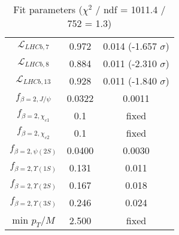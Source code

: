\begin{table}[h!]
\begin{tabular}{c|c|c}
$\mathcal L_{LHCb,7}$ & 0.972 & 0.014 (-1.657 $\sigma$) \\
$\mathcal L_{LHCb,8}$ & 0.884 & 0.011 (-2.310 $\sigma$) \\
$\mathcal L_{LHCb,13}$ & 0.928 & 0.011 (-1.840 $\sigma$) \\
$f_{\beta=2,J/\psi}$ & 0.0322 & 0.0011 \\
$f_{\beta=2,\chi_{c1}}$ & 0.1 & fixed \\
$f_{\beta=2,\chi_{c2}}$ & 0.1 & fixed \\
$f_{\beta=2,\psi(2S)}$ & 0.0400 & 0.0030 \\
$f_{\beta=2,\Upsilon(1S)}$ & 0.131 & 0.011 \\
$f_{\beta=2,\Upsilon(2S)}$ & 0.167 & 0.018 \\
$f_{\beta=2,\Upsilon(3S)}$ & 0.246 & 0.024 \\
min $p_T/M$ & 2.500 & fixed \\
\end{tabular}
\caption{Fit parameters ($\chi^2$ / ndf = 1011.4 / 752 = 1.3)}
\end{table}
